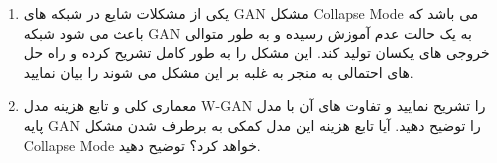 
\begin{enumerate}[label=(\alph*)]
	\item
	
یکی از مشکلات شایع در شبکه های GAN مشکل Collapse Mode می باشد که باعث می شود شبکه GAN به یک حالت عدم آموزش رسیده و به طور متوالی خروجی های یکسان تولید کند. این مشکل را به طور کامل تشریح کرده و راه حل های احتمالی به منجر به غلبه بر این مشکل می شوند را بیان نمایید.

	\item
	
	معماری کلی و تابع هزینه مدل W-GAN را تشریح نمایید و تفاوت های آن با مدل پایه GAN را توضیح دهید. آیا تابع هزینه این مدل کمکی به برطرف شدن مشکل Collapse Mode خواهد کرد؟ توضیح دهید.
	
\end{enumerate}